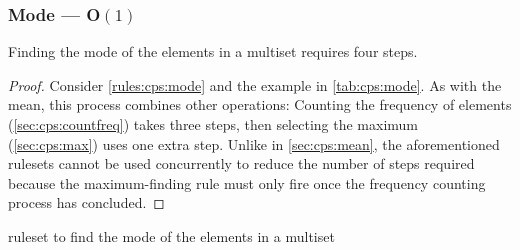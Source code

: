 \subsubsection{Mode --- O\((1)\)}  \label{sec:cps:mode}

\begin{proposition}\label{prop:cps:mode}
Finding the mode of the elements in a multiset requires four steps.
\end{proposition}

\begin{proof}
Consider \cref{rules:cps:mode} and the example in \cref{tab:cps:mode}.  As with the mean, this process combines other operations:  Counting the frequency of elements (\cref{sec:cps:countfreq}) takes three steps, then selecting the maximum (\cref{sec:cps:max}) uses one extra step.  Unlike in \cref{sec:cps:mean}, the aforementioned \glspl{ruleset} cannot be used concurrently to reduce the number of steps required because the maximum-finding rule must only fire once the frequency counting process has concluded.
\end{proof}

\begin{cprulesetfloat} \begin{cpruleset}




\end{cpruleset}
\caption{\label{rules:cps:mode}\Gls{ruleset} to find the mode of the elements in a multiset}
\end{cprulesetfloat}

    
